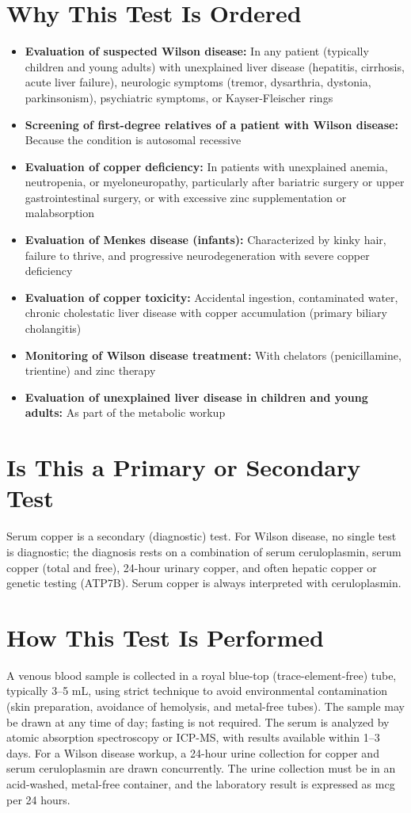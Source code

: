 \section*{Why This Test Is Ordered}
\begin{itemize}
  \item \textbf{Evaluation of suspected Wilson disease:} In any patient (typically children and young adults) with unexplained liver disease (hepatitis, cirrhosis, acute liver failure), neurologic symptoms (tremor, dysarthria, dystonia, parkinsonism), psychiatric symptoms, or Kayser-Fleischer rings
  \item \textbf{Screening of first-degree relatives of a patient with Wilson disease:} Because the condition is autosomal recessive
  \item \textbf{Evaluation of copper deficiency:} In patients with unexplained anemia, neutropenia, or myeloneuropathy, particularly after bariatric surgery or upper gastrointestinal surgery, or with excessive zinc supplementation or malabsorption
  \item \textbf{Evaluation of Menkes disease (infants):} Characterized by kinky hair, failure to thrive, and progressive neurodegeneration with severe copper deficiency
  \item \textbf{Evaluation of copper toxicity:} Accidental ingestion, contaminated water, chronic cholestatic liver disease with copper accumulation (primary biliary cholangitis)
  \item \textbf{Monitoring of Wilson disease treatment:} With chelators (penicillamine, trientine) and zinc therapy
  \item \textbf{Evaluation of unexplained liver disease in children and young adults:} As part of the metabolic workup
\end{itemize}

\section*{Is This a Primary or Secondary Test}
Serum copper is a secondary (diagnostic) test. For Wilson disease, no single test is diagnostic; the diagnosis rests on a combination of serum ceruloplasmin, serum copper (total and free), 24-hour urinary copper, and often hepatic copper or genetic testing (ATP7B). Serum copper is always interpreted with ceruloplasmin.

\section*{How This Test Is Performed}
A venous blood sample is collected in a royal blue-top (trace-element-free) tube, typically 3--5 mL, using strict technique to avoid environmental contamination (skin preparation, avoidance of hemolysis, and metal-free tubes). The sample may be drawn at any time of day; fasting is not required. The serum is analyzed by atomic absorption spectroscopy or ICP-MS, with results available within 1--3 days. For a Wilson disease workup, a 24-hour urine collection for copper and serum ceruloplasmin are drawn concurrently. The urine collection must be in an acid-washed, metal-free container, and the laboratory result is expressed as mcg per 24 hours.

